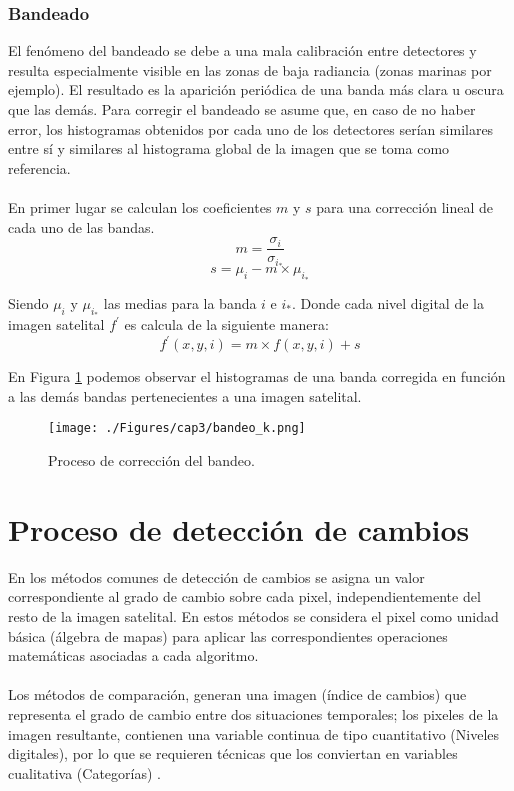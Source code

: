 \subsubsection{Bandeado}\label{subsec:bandeado}
El fen\'omeno del bandeado se debe a una mala calibraci\'on entre detectores y resulta especialmente visible en las zonas de baja radiancia (zonas marinas por ejemplo). El resultado es la aparici\'on peri\'odica de una banda m\'as clara u oscura que las dem\'as.
Para corregir el bandeado se asume que, en caso de no haber error, los histogramas obtenidos por cada uno de los detectores ser\'ian similares entre s\'i y similares al histograma global de la imagen que se toma como referencia.\\~\\
En primer lugar se calculan los coeficientes $ m $ y $ s $ para una correcci\'on lineal de cada uno de las bandas.
		\begin{equation}
		m =\dfrac{\sigma_{i}}{\sigma_{i_{*}}}
		\end{equation} 	
				\begin{equation}
				s=\mu_{i} - m \times \mu_{i_{*}}
				\end{equation} 	
				
Siendo $ \mu_{i} $ y $ \mu_{i_{*}} $ las medias para la banda $ i $ e $ i_{*} $. Donde cada nivel digital de la imagen satelital $ f^{'} $ es calcula de la siguiente manera:
				\begin{equation}
				f^{'}(x,y,i) = m \times f(x,y,i) + s
				\end{equation} 				

En Figura \ref{fig:bandeado} podemos observar el histogramas de una banda corregida en funci\'on a las dem\'as bandas pertenecientes a una imagen satelital. 
    \begin{figure}[H]
    	\centering
    	\texttt{[image: ./Figures/cap3/bandeo\_k.png]}
    	\caption{Proceso de correcci\'on del bandeo.}
    	\label{fig:bandeado}
    \end{figure}

\section{Proceso de detecci\'on de cambios}
	En los m\'etodos comunes de detecci\'on de cambios se asigna un valor correspondiente al grado de cambio sobre cada pixel, independientemente del resto de la imagen satelital. En estos m\'etodos se considera el pixel como unidad b\'asica (\'algebra de mapas) para aplicar las correspondientes operaciones matem\'aticas asociadas a cada algoritmo.\\~\\
Los m\'etodos de comparaci\'on, generan una imagen (\'indice de cambios) que representa el grado de cambio entre dos situaciones temporales; los pixeles de la imagen resultante, contienen una variable continua de tipo cuantitativo (Niveles digitales), por lo que se requieren t\'ecnicas que los conviertan en variables cualitativa (Categor\'ias) \cite{martinez2013normalizacion}.

